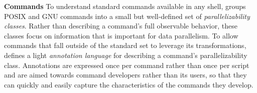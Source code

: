 \documentclass[letterpaper,twocolumn,10pt]{article}
\newcommand{\heading}[1]{\vspace{4pt}\noindent\textbf{#1}\enspace}
\begin{document}
\heading{Commands}
To understand standard commands available in any shell, \sys groups POSIX and GNU commands into a small but well-defined set of \emph{parallelizability classes}.
Rather than describing a command's full observable behavior, these classes focus on information that is important for data parallelism.
To allow commands that fall outside of the standard set to leverage its transformations, \sys defines a light \emph{annotation language} for describing a command's parallelizability class.
Annotations are expressed once per command rather than once per script and are aimed towards command developers rather than its users, so that they can quickly and easily capture the characteristics of the commands they develop.

\end{document}
